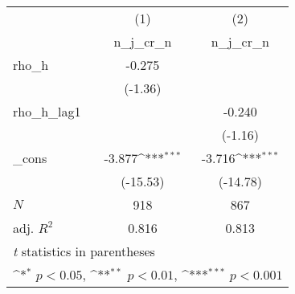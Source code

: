 {
\def\sym#1{\ifmmode^{#1}\else\(^{#1}\)\fi}
\begin{tabular}{l*{2}{c}}
\toprule
            &\multicolumn{1}{c}{(1)}&\multicolumn{1}{c}{(2)}\\
            &\multicolumn{1}{c}{n\_j\_cr\_n}&\multicolumn{1}{c}{n\_j\_cr\_n}\\
\midrule
rho\_h       &      -0.275         &                     \\
            &     (-1.36)         &                     \\
\addlinespace
rho\_h\_lag1  &                     &      -0.240         \\
            &                     &     (-1.16)         \\
\addlinespace
\_cons      &      -3.877\sym{***}&      -3.716\sym{***}\\
            &    (-15.53)         &    (-14.78)         \\
\midrule
\(N\)       &         918         &         867         \\
adj. \(R^{2}\)&       0.816         &       0.813         \\
\bottomrule
\multicolumn{3}{l}{\footnotesize \textit{t} statistics in parentheses}\\
\multicolumn{3}{l}{\footnotesize \sym{*} \(p<0.05\), \sym{**} \(p<0.01\), \sym{***} \(p<0.001\)}\\
\end{tabular}
}
